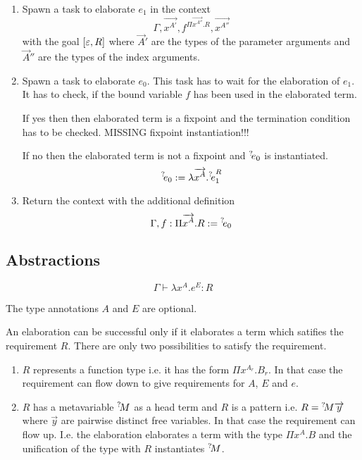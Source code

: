 \begin{enumerate}
    \item Spawn a task to elaborate $e_1$ in the context
        $$
        \Gamma, \vec {x^{A'}}, f^{\Pi \vec {x^{A''}}. R}, \vec {x^{A''}}
        $$
        with the goal
            $[\varepsilon, R]$
        where
            $\vec A'$
        are the types of the parameter arguments and
            $\vec A''$
        are the types of the index arguments.

    \item Spawn a task to elaborate $e_0$. This task has to wait for the
        elaboration of $e_1$. It has to check, if the bound variable $f$ has
        been used in the elaborated term.

        If yes then then elaborated term is a fixpoint and the termination
        condition has to be checked. MISSING fixpoint instantiation!!!

        If no then the elaborated term is not a fixpoint and ${{}^? \kern-0.2em e}_0$ is
        instantiated.
        $$
            {{}^? \kern-0.2em e}_0 := \lambda {\overrightarrow {x^A}}. {{}^? \kern-0.2em e}_1^R
        $$

    \item Return the context with the additional definition
            $$
                \Gamma, f: \Pi {\overrightarrow {x^A}}. R := {{}^? \kern-0.2em e}_0
            $$
\end{enumerate}


\subsection{Abstractions}

$$
\Gamma \vdash \lambda x^A. e^E : R
$$

The type annotations $A$ and $E$ are optional.

An elaboration can be successful only if it elaborates a term which satifies the
requirement $R$. There are only two possibilities to satisfy the requirement.

\begin{enumerate}
    \item $R$ represents a function type i.e. it has the form $\Pi x^{A_r}.
        B_r$. In that case the requirement can flow down to give requirements
        for $A$, $E$ and $e$.

    \item $R$ has a metavariable ${{}^? \kern-0.2em M}$ as a head term and $R$ is a pattern
        i.e. $R = {{}^? \kern-0.2em M} {\overrightarrow {y}}$ where $\vec y$ are pairwise distinct free
        variables. In that case the requirement can flow up. I.e. the
        elaboration elaborates a term with the type $\Pi x^A. B$ and the
        unification of the type with $R$ instantiates ${{}^? \kern-0.2em M}$.
\end{enumerate}


